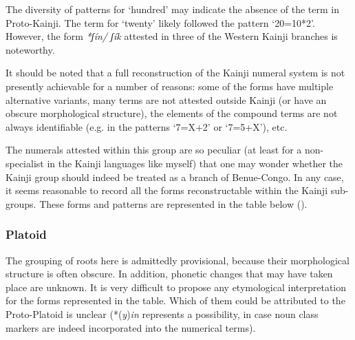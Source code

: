 The diversity of patterns for `hundred' may indicate the absence of the term in Proto-Kainji. The term for `twenty' likely followed the pattern ‘20=10*2’. However, the form \textit{*ʃín/ ʃík} attested in three of the Western Kainji branches is noteworthy. 

  
It should be noted that a full reconstruction of the Kainji numeral system is not presently achievable for a number of reasons: some of the forms have multiple alternative variants, many terms are not attested outside Kainji (or have an obscure morphological structure), the elements of the compound terms are not always identifiable (e.g. in the patterns ‘7={X}+2’ or ‘7=5+{X}’), etc.

The numerals attested within this group are so peculiar (at least for a non-specialist in the Kainji languages like myself) that one may wonder whether the Kainji group should indeed be treated as a branch of Benue-Congo. In any case, it seems reasonable to record all the forms reconstructable within the Kainji sub-groups. These forms and patterns are represented in the table below ().


\newpage  
\subsubsection{Platoid}\label{sec:3.1.2.8}


The grouping of roots here is admittedly provisional, because their morphological structure is often obscure. In addition, phonetic changes that may have taken place are unknown. It is very difficult to propose any etymological interpretation for the forms represented in the table. Which of them could be attributed to the Proto-Platoid is unclear (*(\textit{y})\textit{in} represents a possibility, in case noun class markers are indeed incorporated into the numerical terms).


